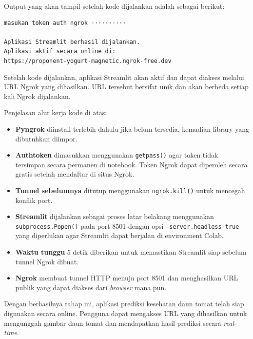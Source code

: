 Output yang akan tampil setelah kode dijalankan adalah sebagai berikut:

\begin{outputcode}[H]
\begin{lstlisting}[language={}]
masukan token auth ngrok ··········

Aplikasi Streamlit berhasil dijalankan.
Aplikasi aktif secara online di:
https://proponent-yogurt-magnetic.ngrok-free.dev
\end{lstlisting}
\caption{Output menjalankan Streamlit dengan Ngrok}
\end{outputcode}

Setelah kode dijalankan, aplikasi Streamlit akan aktif dan dapat diakses melalui URL Ngrok yang dihasilkan. URL tersebut bersifat unik dan akan berbeda setiap kali Ngrok dijalankan.

Penjelasan alur kerja kode di atas:

\begin{itemize}
    \item \textbf{Pyngrok} diinstall terlebih dahulu jika belum tersedia, kemudian library yang dibutuhkan diimpor.
    \item \textbf{Authtoken} dimasukkan menggunakan \texttt{getpass()} agar token tidak tersimpan secara permanen di notebook. Token Ngrok dapat diperoleh secara gratis setelah mendaftar di situs Ngrok.
    \item \textbf{Tunnel sebelumnya} ditutup menggunakan \texttt{ngrok.kill()} untuk mencegah konflik port.
    \item \textbf{Streamlit} dijalankan sebagai proses latar belakang menggunakan \texttt{subprocess.Popen()} pada port 8501 dengan opsi \texttt{--server.headless true} yang diperlukan agar Streamlit dapat berjalan di environment Colab.
    \item \textbf{Waktu tunggu} 5 detik diberikan untuk memastikan Streamlit siap sebelum tunnel Ngrok dibuat.
    \item \textbf{Ngrok} membuat tunnel HTTP menuju port 8501 dan menghasilkan URL publik yang dapat diakses dari \textit{browser} mana pun.
\end{itemize}

Dengan berhasilnya tahap ini, aplikasi prediksi kesehatan daun tomat telah siap digunakan secara online. Pengguna dapat mengakses URL yang dihasilkan untuk mengunggah gambar daun tomat dan mendapatkan hasil prediksi secara \textit{real-time}.

